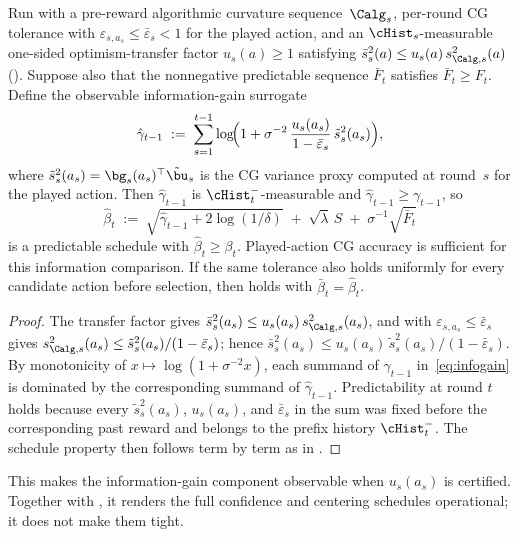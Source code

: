 \begin{corollary}\label{cor:gammahat}
Run  with a pre-reward algorithmic curvature
sequence~$\Calg_s$, per-round CG tolerance with
$\varepsilon_{s,a_s}\le\bar\varepsilon_s<1$ for the played action, and an
$\cHist_s$-measurable one-sided optimism-transfer factor $u_s(a)\ge1$ satisfying
$\bar s_s^2(a)\le u_s(a)\,s_{\Calg,s}^2(a)$ ().
Suppose also that the nonnegative predictable sequence $\bar F_t$ satisfies
$\bar F_t\ge F_t$.
Define the observable information-gain surrogate
\[
  \hat\gamma_{t-1} \;:=\;
  \sum_{s=1}^{t-1}\log\!\Bigl(1+\sigma^{-2}\,
  \frac{u_s(a_s)}{1-\bar\varepsilon_s}\,
  \tilde s_s^2(a_s)\Bigr),
\]
where $\tilde s_s^2(a_s)=\bg_s(a_s)^\top\tilde\bu_s$ is the CG variance
proxy computed at round~$s$ for the played action.
Then $\hat\gamma_{t-1}$ is $\cHist_t^-$-measurable and
$\hat\gamma_{t-1}\ge\gamma_{t-1}$, so
\[
  \hat\beta_t \;:=\;
  \sqrt{\hat\gamma_{t-1}+2\log(1/\delta)}
  \;+\;\sqrt{\lambda}\,S
  \;+\;\sigma^{-1}\sqrt{\bar F_t}
\]
is a predictable schedule with $\hat\beta_t\ge\beta_t$.  Played-action CG
accuracy is sufficient for this information comparison.  If the same tolerance
also holds uniformly for every candidate action before selection, then
 holds with $\bar\beta_t=\hat\beta_t$.
\end{corollary}
\begin{proof}
The transfer factor gives
$\bar s_s^2(a_s)\le u_s(a_s)\,s_{\Calg,s}^2(a_s)$, and 
with $\varepsilon_{s,a_s}\le\bar\varepsilon_s$ gives
$s_{\Calg,s}^2(a_s)\le\tilde s_s^2(a_s)/(1-\bar\varepsilon_s)$;
hence
$\bar s_s^2(a_s)\le u_s(a_s)\,\tilde s_s^2(a_s)/(1-\bar\varepsilon_s)$.
By monotonicity of $x\mapsto\log(1+\sigma^{-2}x)$, each summand of
$\gamma_{t-1}$ in~\eqref{eq:infogain} is dominated by the corresponding
summand of $\hat\gamma_{t-1}$.
Predictability at round $t$ holds because every
$\tilde s_s^2(a_s)$, $u_s(a_s)$, and $\bar\varepsilon_s$ in the sum was
fixed before the corresponding past reward and belongs to the prefix history
$\cHist_t^-$.
The schedule property then follows term by term as in
.
\end{proof}

\noindent
This makes the information-gain component observable when $u_s(a_s)$ is
certified.  Together with , it renders the full
confidence and centering schedules operational; it does not make them tight.


